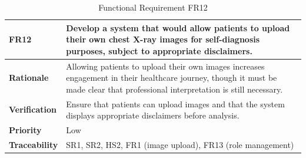 \documentclass[12pt]{article}
\begin{document}
\begin{table}[h!]
\centering
{}
\begin{tabular}{|p{3.5cm}|p{11.5cm}|}
\hline
\rowcolor{gray!30}
\textbf{FR12} & Develop a system that would allow patients to upload their own chest X-ray images for self-diagnosis purposes, subject to appropriate disclaimers. \\
\hline
\textbf{Rationale} & Allowing patients to upload their own images increases engagement in their healthcare journey, though it must be made clear that professional interpretation is still necessary. \\
\hline
\textbf{Verification} & Ensure that patients can upload images and that the system displays appropriate disclaimers before analysis. \\
\hline
\textbf{Priority} & Low \\
\hline
\textbf{Traceability} & SR1, SR2, HS2, FR1 (image upload), FR13 (role management) \\
\hline
\end{tabular}
\caption{Functional Requirement FR12}
\end{table}
\end{document}
